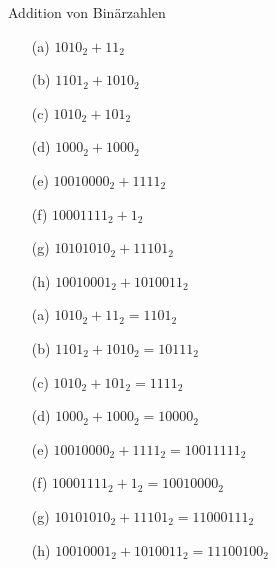 \begin{exercise}{Addition von Binärzahlen}
\begin{body}
\begin{center}
\begin{minipage}{0.45\textwidth}
\begin{itemize}
\item[(a)] $1010_2 +   11_2$
\item[(b)] $1101_2 + 1010_2$
\item[(c)] $1010_2 +  101_2$
\item[(d)] $1000_2 + 1000_2$
\end{itemize}
\end{minipage}
\begin{minipage}{0.45\textwidth}
\begin{itemize}
\item[(e)] $10010000_2 + 1111_2$
\item[(f)] $10001111_2 + 1_2$
\item[(g)] $10101010_2 + 11101_2$
\item[(h)] $10010001_2 + 1010011_2$
\end{itemize}
\end{minipage}
\end{center}
\end{body}

\begin{solution}
\begin{center}
\begin{minipage}{0.45\textwidth}
\begin{itemize}
\item[(a)] $1010_2 +   11_2 = 1101_2$
\item[(b)] $1101_2 + 1010_2 = 10111_2$
\item[(c)] $1010_2 +  101_2 = 1111_2$
\item[(d)] $1000_2 + 1000_2 = 10000_2$
\end{itemize}
\end{minipage}
\begin{minipage}{0.45\textwidth}
\begin{itemize}
\item[(e)] $10010000_2 + 1111_2 = 10011111_2$
\item[(f)] $10001111_2 + 1_2 = 10010000_2$
\item[(g)] $10101010_2 + 11101_2 = 11000111_2$
\item[(h)] $10010001_2 + 1010011_2 = 11100100_2$
\end{itemize}
\end{minipage}
\end{center}
\end{solution}

\end{exercise}